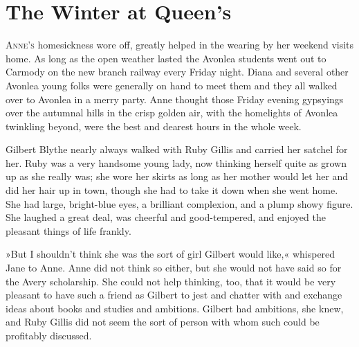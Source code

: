 \chapter{The Winter at Queen’s}

\lettrine[lines=4]{A}{nne's} homesickness wore off, greatly helped in the wearing by her weekend visits home. As long as the open weather lasted the Avonlea students went out to Carmody on the new branch railway every Friday night. Diana and several other Avonlea young folks were generally on hand to meet them and they all walked over to Avonlea in a merry party. Anne thought those Friday evening gypsyings over the autumnal hills in the crisp golden air, with the homelights of Avonlea twinkling beyond, were the best and dearest hours in the whole week.

Gilbert Blythe nearly always walked with Ruby Gillis and carried her satchel for her. Ruby was a very handsome young lady, now thinking herself quite as grown up as she really was; she wore her skirts as long as her mother would let her and did her hair up in town, though she had to take it down when she went home. She had large, bright-blue eyes, a brilliant complexion, and a plump showy figure. She laughed a great deal, was cheerful and good-tempered, and enjoyed the pleasant things of life frankly.

»But I shouldn’t think she was the sort of girl Gilbert would like,« whispered Jane to Anne. Anne did not think so either, but she would not have said so for the Avery scholarship. She could not help thinking, too, that it would be very pleasant to have such a friend as Gilbert to jest and chatter with and exchange ideas about books and studies and ambitions. Gilbert had ambitions, she knew, and Ruby Gillis did not seem the sort of person with whom such could be profitably discussed.

